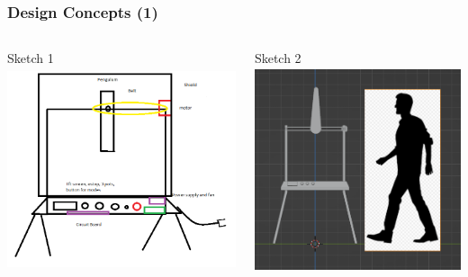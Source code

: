 \documentclass[aspectratio=169]{beamer}
\begin{document}
\begin{frame}
    \frametitle{Design Concepts (1)}

    \begin{columns}
        \begin{column}{0.48\textwidth}
            \begin{block}{Sketch 1}
                \includegraphics[height=6cm]{../../../Notes/Sketches/Basic Mock-Up Sketch.png}
            \end{block}
        \end{column}

        \begin{column}{0.48\textwidth}
            \begin{block}{Sketch 2}
                \includegraphics[height=6cm]{Scale}
            \end{block}
        \end{column}
    \end{columns}
\end{frame}
\end{document}
